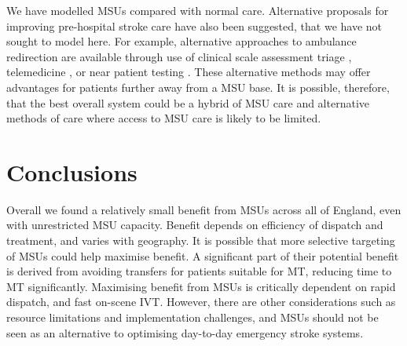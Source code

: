We have modelled MSUs compared with normal care. Alternative proposals for improving pre-hospital stroke care have also been suggested, that we have not sought to model here. For example, alternative approaches to ambulance redirection are available through use of clinical scale assessment triage \cite{dekker_prehospital_2025}, telemedicine \cite{sarpourian_application_2023}, or near patient testing \cite{shaw_rapid_2024}. These alternative methods may offer advantages for patients further away from a MSU base. It is possible, therefore, that the best overall system could be a hybrid of MSU care and alternative methods of care where access to MSU care is likely to be limited.

\section{Conclusions}

Overall we found a relatively small benefit from MSUs across all of England, even with unrestricted MSU capacity. Benefit depends on efficiency of dispatch and treatment, and varies with geography. It is possible that more selective targeting of MSUs could help maximise benefit. A significant part of their potential benefit is derived from avoiding transfers for patients suitable for MT, reducing time to MT significantly. Maximising benefit from MSUs is critically dependent on rapid dispatch, and fast on-scene IVT. However, there are other considerations such as resource limitations and implementation challenges, and MSUs should not be seen as an alternative to optimising day-to-day emergency stroke systems.